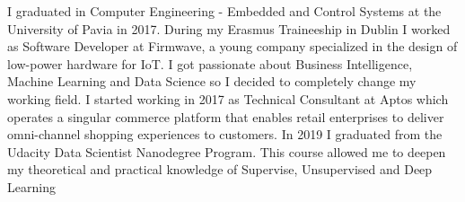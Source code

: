 \documentclass[9pt]{developercv} %
\begin{document}
\begin{minipage}[t]{0.5\textwidth} %
	\vspace{-\baselineskip} %
	
	I graduated in Computer Engineering - Embedded and Control Systems at the University of Pavia in 2017. During my Erasmus Traineeship in Dublin I worked as Software Developer at Firmwave, a young company specialized in the design of low-power hardware for IoT. I got passionate about Business Intelligence, Machine Learning and Data Science so I decided to completely change my working field. I started working in 2017 as Technical Consultant at Aptos which operates a singular commerce platform that enables retail enterprises to deliver omni-channel shopping experiences to customers. In 2019 I graduated from the Udacity Data Scientist Nanodegree Program. This course allowed me to deepen my theoretical and practical knowledge of Supervise, Unsupervised and Deep Learning
\end{minipage}
\hfill %
\begin{minipage}[t]{0.4\textwidth} %
	\vspace{-\baselineskip} %
	\begin{barchart}{5.5}
	\end{barchart}
\end{minipage}

\begin{center}
\end{center}


\end{document}
